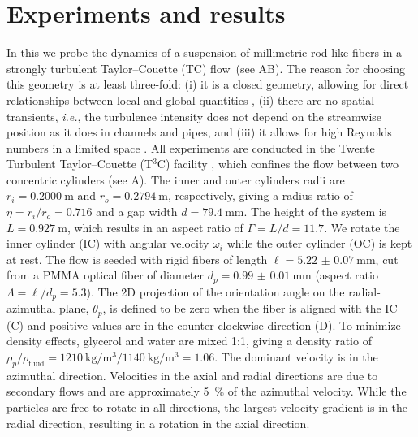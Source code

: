 \section{Experiments and results}
\indent In this \docname we probe the dynamics of a suspension of millimetric
rod-like fibers in a strongly turbulent Taylor--Couette (TC) flow~(see
AB). The reason for choosing this geometry is at least
three-fold: (i) it is a closed geometry, allowing for direct relationships
between local and global quantities \cite{Eckhardt2007}, (ii) there are no
spatial transients, \textit{i.e.}, the turbulence intensity does not depend on
the streamwise position as it does in channels and pipes, and (iii) it allows
for high Reynolds numbers in a limited space \cite{Grossmann2016}. %
%
All experiments are conducted in the Twente Turbulent Taylor--Couette (T$^3$C)
facility \cite{vanGils2011}, which confines the flow between two concentric
cylinders (see A).
The inner and outer cylinders radii are $r_i=\SI{0.2000}{\metre}$ and
$r_o=\SI{0.2794}{\metre}$, respectively, giving a radius ratio of
$\eta=r_i/r_o=0.716$ and a gap width $d=\SI{79.4}{\milli\metre}$. The height
of the system is $L=\SI{0.927}{\metre}$, which results in an aspect ratio of
$\Gamma=L/d=11.7$. We rotate the inner cylinder (IC) with angular velocity
$\omega_i$ while the outer cylinder (OC) is kept at rest. The flow is seeded with rigid fibers of length 
$\ell = \SI[separate-uncertainty =
true,multi-part-units=single]{5.22(7)}{\milli\metre}$,
cut from a PMMA optical fiber of diameter 
$d_p =\SI[separate-uncertainty = true,multi-part-units=single]{0.99(1)}{\milli\metre}$
(aspect ratio $\Lambda=\ell/d_p = 5.3$).
The 2D projection of the orientation angle on the
radial-azimuthal plane, $\theta_p$, is defined to be zero when the fiber is
aligned with the IC (C) and positive values
are in the counter-clockwise direction (D).
To minimize density effects, glycerol and water are mixed 1:1, giving a density ratio of $\rho_p/\rho_\text{fluid}=\SI{1210}{\kilo\gram\per\metre\cubed}/\SI{1140}{\kilo\gram\per\metre\cubed}=1.06$.
The dominant velocity is in the azimuthal
direction. Velocities in the axial and radial directions are due to secondary
flows and are approximately \SI{5}{\percent} of the azimuthal velocity. While
the particles are free to rotate in all directions, the largest velocity
gradient is in the radial direction, resulting in a rotation in the axial
direction.%
